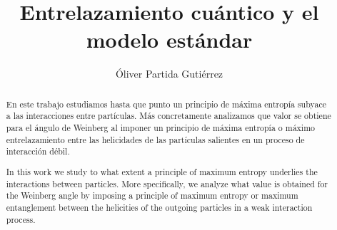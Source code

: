 \documentclass{article}
\theoremstyle{plain}
\theoremstyle{definition}
\begin{document}
	\title{
		Entrelazamiento cuántico y el modelo estándar
		\\
	}%
	
	\author{Óliver Partida Gutiérrez
	}

	\maketitle
	\begin{abstract}
		En este trabajo estudiamos hasta que punto un principio de máxima entropía subyace a las  interacciones entre partículas. Más concretamente analizamos que valor se obtiene para el ángulo de Weinberg al imponer un principio de máxima entropía o máximo entrelazamiento entre las helicidades de las partículas salientes en un proceso de interacción débil. 
	\end{abstract}
	\renewcommand{\abstractname}{Abstract}
	\begin{abstract}
		In this work we study to what extent a principle of maximum entropy underlies the interactions between particles. More specifically, we analyze what value is obtained for the Weinberg angle by imposing a principle of maximum entropy or maximum entanglement between the helicities of the outgoing particles in a weak interaction process.   
	\end{abstract}
	\tableofcontents
\end{document}
